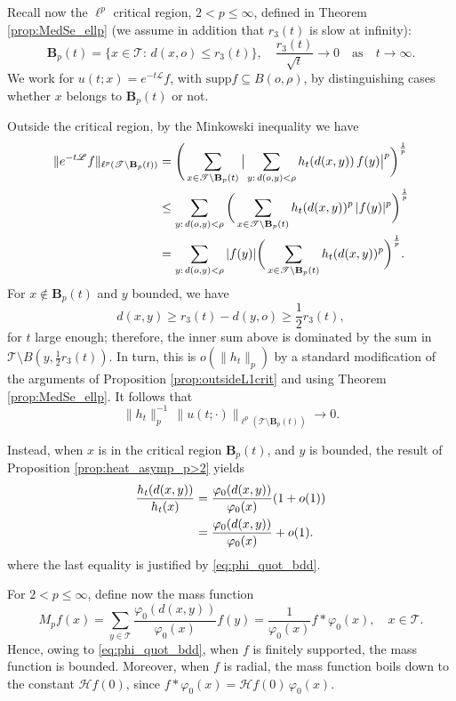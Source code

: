 \documentclass[11pt,a4paper,reqno]{amsart}
\renewcommand\mathcal{\mathscr}
\theoremstyle{plain}
\theoremstyle{remark}
\theoremstyle{definition}
\theoremstyle{remark}
\numberwithin{equation}{section}
\newcommand\supp{\mathrm{supp}}
\begin{document}
	Recall now the $\ell^p$ critical region, $2<p\leq \infty$, defined in Theorem \ref{prop:MedSe_ellp} (we assume in addition that $r_3(t)$ is slow at infinity):  
	$$\textbf{B}_p(t)=\{x\in \mathcal{T}:\, d(x,o)\leq r_3(t)\},  \quad \frac{r_3(t)}{\sqrt{t}}\to 0 \quad \text{as} \quad t\to \infty.$$
	We work for $u(t;x)=e^{-t\mathcal{L}}f$, with $\supp f\subseteq B(o, \rho)$, by distinguishing cases whether $x$ belongs to $\textbf{B}_p(t)$ or not. 
	
	Outside the critical region, by the Minkowski inequality we have
	\begin{align*}
		\|e^{-t\mathcal{L}}f\|_{\ell^p(\mathcal{T} \setminus \textbf{B}_p(t))}&=\Bigg(\sum_{x \in \mathcal{T} \setminus \textbf{B}_p(t)} 
		\big| \sum_{y: \, d(o,y)<\rho} h_t(d(x,y)) \, f(y) \big|^p \bigg)^{\frac{1}{p}}\\
		&\leq 
		\sum_{y: \, d(o,y)<\rho}
		\bigg( \sum_{x \in \mathcal{T} \setminus \textbf{B}_p(t)} h_t(d(x,y))^p\, |f(y)|^p \bigg)^{\frac{1}{p}} \notag\\
		&=
		\sum_{y: \, d(o,y)<\rho}|f(y)|\bigg( \sum_{x \in \mathcal{T} \setminus \textbf{B}_p(t)} h_t(d(x,y))^p \bigg)^{\frac{1}{p}}. 
	\end{align*}
For $x\notin \textbf{B}_p(t)$ and $y$ bounded, we have
	\[
	d(x,y)\geq r_3(t)-d(y,o)\geq \frac{1}{2}r_3(t),
	\] 
for $t$ large enough; therefore, the inner sum above is dominated by the sum in $\mathcal{T}\setminus B(y, \frac{1}{2}r_3(t))$. In turn, this is $o(\|h_t\|_p)$ by a standard modification of the arguments of Proposition \ref{prop:outsideL1crit} and using Theorem \ref{prop:MedSe_ellp}. It follows that
\[
\|h_t\|_p^{-1}\,\|u(t;\cdot)\|_{\ell^p(\mathcal{T}\setminus \textbf{B}_p(t))}\to 0.
\]

Instead, when $x$ is in the critical region $\textbf{B}_p(t)$, and $y$ is bounded, the result of Proposition \ref{prop:heat_asymp_p>2} yields
	\begin{align}\label{eq:ratio_p>2}
		\frac{h_t(d(x,y))}{h_t(x)}&=\frac{\varphi_0(d(x,y))}{\varphi_0(x)} (1+o(1))\notag\\
		&=\frac{\varphi_0(d(x,y))}{\varphi_0(x)} +o(1).
	\end{align}
where the last equality is justified by \eqref{eq:phi_quot_bdd}.

	For $2< p\leq \infty$, define now the mass function
	\begin{equation}\label{eq:massfct>2}
	M_pf(x)=\sum_{y\in \mathcal{T}}\frac{\varphi_0(d(x,y))}{\varphi_0(x)}f(y)=\frac{1}{\varphi_0(x)}f\ast\varphi_0(x), \quad x\in \mathcal{T}.
	\end{equation}
	Hence, owing to \eqref{eq:phi_quot_bdd}, when $f$ is finitely supported, the mass function is bounded. Moreover, when $f$ is radial, the mass function boils down to the constant $\mathcal{H}f(0)$, since $f\ast\varphi_0(x)=\mathcal{H}f(0)\, \varphi_0(x)$.
	
\end{document}
